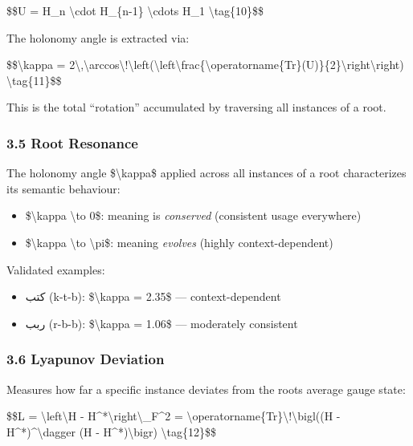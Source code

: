 \documentclass[12pt,a4paper]{article}
\providecommand{\tightlist}{\setlength{\itemsep}{0pt}\setlength{\parskip}{0pt}}
\begin{document}
\$\$U = H\_n \textbackslash cdot H\_\{n-1\} \textbackslash cdots H\_1
\textbackslash tag\{10\}\$\$

The holonomy angle is extracted via:

\$\$\textbackslash kappa =
2\textbackslash,\textbackslash arccos\textbackslash!\textbackslash left(\textbackslash left\textbar\textbackslash frac\{\textbackslash operatorname\{Tr\}(U)\}\{2\}\textbackslash right\textbar\textbackslash right)
\textbackslash tag\{11\}\$\$

This is the total ``rotation'' accumulated by traversing all instances
of a root.

\subsubsection{3.5 Root Resonance}\label{root-resonance}

The holonomy angle \$\textbackslash kappa\$ applied across all instances
of a root characterizes its semantic behaviour:

\begin{itemize}
\tightlist
\item
  \$\textbackslash kappa \textbackslash to 0\$: meaning is
  \emph{conserved} (consistent usage everywhere)
\item
  \$\textbackslash kappa \textbackslash to \textbackslash pi\$: meaning
  \emph{evolves} (highly context-dependent)
\end{itemize}

Validated examples:

\begin{itemize}
\tightlist
\item
  {كتب} (k-t-b): \$\textbackslash kappa = 2.35\$ --- context-dependent
\item
  {ربب} (r-b-b): \$\textbackslash kappa = 1.06\$ --- moderately
  consistent
\end{itemize}

\subsubsection{3.6 Lyapunov Deviation}\label{lyapunov-deviation}

Measures how far a specific instance deviates from the
root\textquotesingle s average gauge state:

\$\$L = \textbackslash left\textbackslash\textbar H -
H\^{}*\textbackslash right\textbackslash\textbar\_F\^{}2 =
\textbackslash operatorname\{Tr\}\textbackslash!\textbackslash bigl((H -
H\^{}*)\^{}\textbackslash dagger (H - H\^{}*)\textbackslash bigr)
\textbackslash tag\{12\}\$\$
\end{document}
